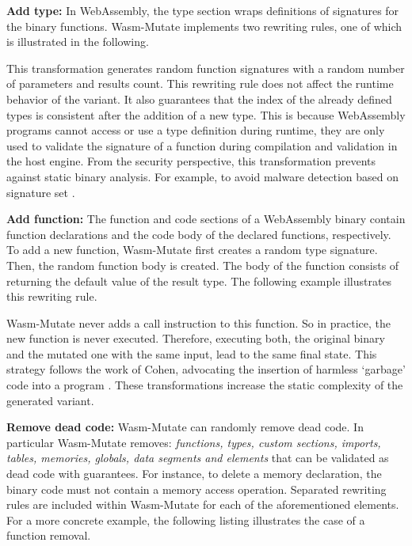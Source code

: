 \documentclass[a4paper,fleqn]{cas-dc}
\newcommand{\tool}{{\sc Wasm-Mutate}\xspace}
\begin{document}
\textbf{Add type:}
In WebAssembly, the type section wraps definitions of signatures for the binary functions.
\tool implements two rewriting rules, one of which is illustrated in the following. 



This transformation generates random function signatures with a random number of parameters and results count.
This rewriting rule does not affect the runtime behavior of the  variant.
It also guarantees that the index of the already defined types is consistent after the addition of a new type. This is because WebAssembly programs cannot access or use a type definition during runtime, they are only used to validate the signature of a function during compilation and validation in the host engine.
From the security perspective, this transformation prevents against static binary analysis. 
For example, to avoid malware detection based on signature set \cite{CABRERAARTEAGA2023103296}.

\textbf{Add function:} The function and code sections of a WebAssembly binary contain function  declarations and the code body of the declared functions, respectively.
To add a new function, \tool first creates a random type signature.
Then, the random function body is created.
The body of the function consists of returning the default value of the result type.
The following example illustrates this rewriting rule.



\tool never adds a call instruction to this function.
So in practice, the new function is never executed.
Therefore, executing both, the original binary and the mutated one with the same input, lead to the same final state.
This strategy follows the work of Cohen, advocating the insertion of harmless `garbage' code into a program \cite{cohen1993operating}. 
These transformations increase the static complexity of the generated variant.

\textbf{Remove dead code:} \tool can randomly remove dead code.
In particular \tool removes: \emph{functions, types, custom sections, imports, tables, memories, globals, data segments and elements} that can be validated as dead code with guarantees.
For instance, to delete a memory declaration, the binary code must not contain a memory access operation. 
Separated rewriting rules are included within \tool for each of the aforementioned elements.
For a more concrete example, the following listing illustrates the case of a function removal.
\end{document}
